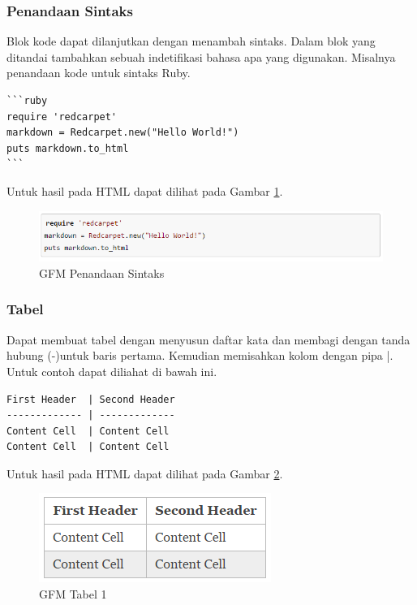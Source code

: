 \subsubsection{Penandaan Sintaks}
Blok kode dapat dilanjutkan dengan menambah sintaks. Dalam blok yang ditandai
tambahkan sebuah indetifikasi bahasa apa yang digunakan. Misalnya penandaan kode
untuk sintaks Ruby.
\begin{lstlisting}
```ruby
require 'redcarpet'
markdown = Redcarpet.new("Hello World!")
puts markdown.to_html
```
\end{lstlisting}
Untuk hasil pada HTML dapat dilihat pada Gambar \ref{fig:ruby}.
\begin{figure}[H]
\centering
\includegraphics[scale=0.6]{Gambar/ruby.png}
\caption[GFM Penandaan Sintaks]{GFM Penandaan Sintaks}
\label{fig:ruby}
\end{figure}

\subsubsection{Tabel}
Dapat membuat tabel dengan menyusun daftar kata dan membagi dengan tanda hubung
(-)untuk baris pertama. Kemudian memisahkan kolom dengan pipa |. Untuk contoh
dapat diliahat di bawah ini.
\begin{lstlisting}
First Header  | Second Header
------------- | -------------
Content Cell  | Content Cell
Content Cell  | Content Cell
\end{lstlisting}
Untuk hasil pada HTML dapat dilihat pada Gambar \ref{fig:t1}.
\begin{figure}[H]
\centering
\includegraphics[scale=1]{Gambar/t1.png}
\caption[GFM Tabel 1]{GFM Tabel 1}
\label{fig:t1}
\end{figure}

